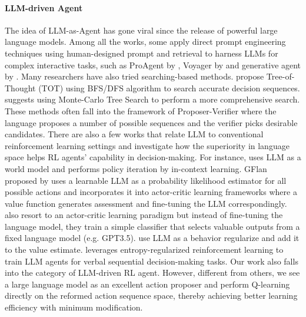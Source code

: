 \documentclass{article} %
\theoremstyle{plain}
\theoremstyle{definition}
\theoremstyle{remark}
\begin{document}
{{\paragraph{LLM-driven Agent} The idea of LLM-as-Agent has gone viral since the release of powerful large language models. Among all the works, some apply direct prompt engineering techniques using human-designed prompt and retrieval to harness LLMs for complex interactive tasks, such as ProAgent by \citep{zhang2023proagent}, Voyager by \citep{wang2023voyager} and generative agent by \citep{park2023generative}. Many researchers have also tried searching-based methods. \citep{yao2023tree} propose Tree-of-Thought (TOT) using BFS/DFS algorithm to search accurate decision sequences. \citep{hao2023reasoning} suggests using Monte-Carlo Tree Search to perform a more comprehensive search. These methods often fall into the framework of Proposer-Verifier \citep{snell2024scaling} where the language proposes a number of possible sequences and the verifier picks desirable candidates. There are also a few works that relate LLM to conventional reinforcement learning settings and investigate how the superiority in language space helps RL agents' capability in decision-making. For instance, \citep{brooks2024large} uses LLM as a world model and performs policy iteration by in-context learning. GFlan proposed by \citep{carta2023grounding} uses a learnable LLM as a probability likelihood estimator for all possible actions and incorporates it into actor-critic learning frameworks where a value function generates assessment and fine-tuning the LLM correspondingly. \citep{yan2023ask} also resort to an actor-critic learning paradigm but instead of fine-tuning the language model, they train a simple classifier that selects valuable outputs from a fixed language model (e.g. GPT3.5). \citep{zhang2024can} use LLM as a behavior regularize and add it to the value estimate. \citep{wen2024entropy} leverages entropy-regularized reinforcement learning to train LLM agents for verbal sequential decision-making tasks. Our work also falls into the category of LLM-driven RL agent. However, different from others, we see a large language model as an excellent action proposer and perform Q-learning directly on the reformed action sequence space, thereby achieving better learning efficiency with minimum modification. 







}

}
\end{document}
